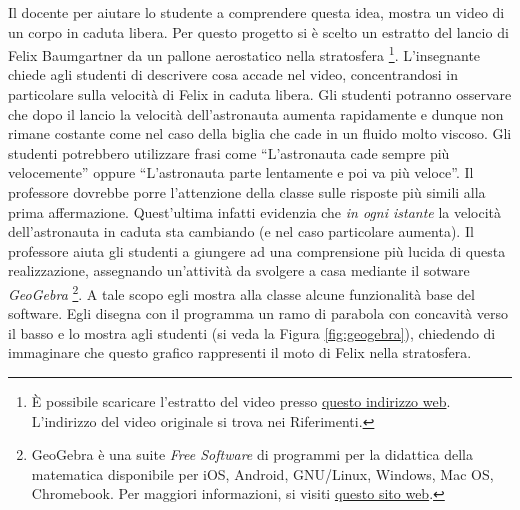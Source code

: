 \documentclass{report} \usepackage[T1]{fontenc} \usepackage[italian]{babel}
\begin{document}
Il docente per aiutare lo studente a comprendere questa idea,
mostra un video di un corpo in caduta libera. Per questo progetto
si è scelto un estratto del lancio di Felix Baumgartner da un
pallone aerostatico nella stratosfera
\footnote{
          \`E possibile scaricare l'estratto del video presso
          \textcolor{blue}{\href{https://github.com/savaroskij/PED1/blob/master/progetto_finale/media/video/felix_baumgartner.mp4?raw=true}{questo indirizzo web}}.
          L'indirizzo del video originale si trova nei Riferimenti\cite{felix}.
         }.
L'insegnante chiede agli studenti di descrivere cosa accade nel
video, concentrandosi in particolare sulla velocità di Felix in caduta
libera. Gli studenti potranno osservare che dopo il lancio la velocità
dell'astronauta aumenta rapidamente e dunque non rimane costante come nel
caso della biglia che cade in un fluido molto viscoso.
Gli studenti potrebbero utilizzare frasi come ``L'astronauta cade
sempre più velocemente'' oppure ``L'astronauta parte
lentamente e poi va più veloce''.
Il professore dovrebbe porre l'attenzione della classe sulle
risposte più simili alla prima affermazione. Quest'ultima
infatti evidenzia che \emph{in ogni istante} la velocità
dell'astronauta in caduta sta cambiando (e nel caso particolare aumenta).
Il professore aiuta gli studenti a giungere ad una comprensione
più lucida di questa realizzazione, assegnando un'attività da svolgere
a casa mediante il sotware \emph{GeoGebra}
\footnote{
          GeoGebra è una suite \emph{Free Software} di programmi per la didattica della
          matematica
          disponibile per iOS, Android, GNU/Linux, Windows, Mac OS, Chromebook.
          Per maggiori informazioni, si visiti
          \textcolor{blue}{\href{https://www.geogebra.org/}{questo sito web}}.
         }.
A tale scopo egli mostra alla classe alcune funzionalità base del software.
Egli disegna con il programma un ramo di parabola con concavità
verso il basso e lo mostra agli studenti (si veda la Figura
\ref{fig:geogebra}), chiedendo di immaginare che questo grafico
rappresenti il moto di Felix nella stratosfera.
\end{document}
